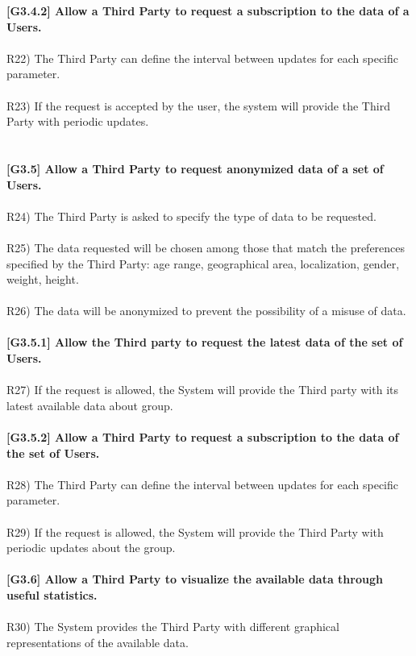 \textbf{[G3.4.2] Allow a Third Party to request a subscription to the data of a Users.} \\ \\
R22) The Third Party can define the interval between updates for each specific parameter. \\ \\
R23) If the request is accepted by the user, the system will provide the Third Party with periodic updates. \\ \\ \\

\textbf{[G3.5] Allow a Third Party to request anonymized data of a set of Users.} \\ \\
R24) The Third Party is asked to specify the type of data to be requested. \\ \\
R25) The data requested will be chosen among those that match the preferences specified by the Third Party: age range, geographical area, localization, gender, weight, height. \\ \\
R26) The data will be anonymized to prevent the possibility of a misuse of data. \\ \\ 

\textbf{[G3.5.1] Allow the Third party to request the latest data of the set of Users.} \\ \\
R27) If the request is allowed, the System will provide the Third party with its latest available data about group. \\ \\

\textbf{[G3.5.2] Allow a Third Party to request a subscription to the data of the set of Users.} \\ \\
R28) The Third Party can define the interval between updates for each specific parameter. \\ \\
R29) If the request is allowed, the System will provide the Third Party with periodic updates about the group. \\ \\ 

\textbf{[G3.6] Allow a Third Party to visualize the available data through useful statistics.} \\ \\
R30) The System provides the Third Party with different graphical representations of the available data. \\ \\

